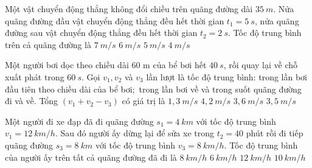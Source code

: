 \begin{vidu}%
Một vật chuyển động thẳng không đổi chiều trên quãng đường dài $35\ m$. Nửa quãng đường đầu vật chuyển động thẳng đều hết thời gian $t_1 = 5\ s$, nửa quãng đường sau vật chuyển động thẳng đều hết thời gian $t_2 = 2\ s$. Tốc độ trung bình trên cả quãng đường là
\choice
{$7\ m/s$}
{$6\ m/s$}
{\True $5\ m/s$}
{$4\ m/s$}	
\end{vidu}
\begin{vidu}
Một người bơi dọc theo chiều dài 60 m của bể bơi hết $40\ s$, rồi quay lại về chỗ xuất phát trong $60\ s$. Gọi $v_1, v_2$ và $v_3$ lần lượt là tốc độ trung bình: trong lần bơi đầu tiên theo chiều dài của bể bơi;\ trong lần bơi về và trong suốt quãng đường đi và về. Tổng $\left(v_1+v_2-v_3\right)$ có giá trị là
\choice
{\True $1,3\ m/s$}
{$4,2\ m/s$}
{$3,6\ m/s$}
{$3,5\ m/s$}
\end{vidu}
\begin{vidu}%
Một người đi xe đạp đã đi quãng đường $s_1 = 4\ km$ với tốc độ trung bình $v_1 = 12\ km/h$. Sau đó người ấy dừng lại để sửa xe trong $t_2 = 40$  phút rồi đi tiếp quãng đường $s_3 = 8\ km$ với tốc độ trung bình $v_3 = 8\  km/h$. Tốc độ trung bình của người ấy trên tất cả quãng đường đã đi là	
\choice
{$8\ km/h$}
{\True $6\ km/h$}
{$12\ km/h$}
{$10\ km/h$}
\end{vidu}
